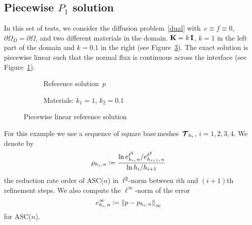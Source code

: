\subsection{Piecewise $P_1$ solution}

In this set of tests, we consider the diffusion problem~\eqref{dual} with~$c \equiv f \equiv 0$, $\partial\Omega_D = \partial\Omega$, and two different materials in the domain. $\boldsymbol{\mathbf{K}} = k\,\boldsymbol{\mathbf{I}}$, $k = 1$ in the left part of the domain and $k = 0.1$ in the right (see Figure~\ref{fig:pwlin:mat}). The exact solution is piecewise linear such that the normal flux is continuous across the interface (see Figure~\ref{fig:pwlin:p}).
	
\begin{figure}[h!]
	\centering
	\label{fig:pwlin}
	\begin{subfigure}{.44\linewidth}
		\centering
		\caption{Reference solution~$p$}
		\label{fig:pwlin:p}
	\end{subfigure}%
	\hfill
	\begin{subfigure}{.4\linewidth}
		\centering
		\caption{Materials: $k_1 = 1$, $k_2 = 0.1$}
		\label{fig:pwlin:mat}
	\end{subfigure}
	\caption{Piecewise linear reference solution}
\end{figure}

For this example we use a sequence of square base\,meshes~${\boldsymbol{\mathbf{\mathcal T}}}_{h_i}$, $i = 1, 2, 3, 4$. We denote by
\begin{equation*}
	\rho_{h_i,\,n} \coloneqq \frac{\ln e^{{\ell^2}}_{h_i,\,n} / e^{{\ell^2}}_{h_{i+1},\,n}}{\ln h_i / h_{i+1}}
\end{equation*}
the reduction rate order of ASC($n$) in~${\ell^2}$-norm between $i$th and $(i+1)$th refinement steps. We also compute the $\ell^{\infty}$-norm of the error
\begin{equation*}
	e^{\infty}_{h_i,\,n} \coloneqq \left\| p - p_{h_i,\,n} \right\|_\infty
\end{equation*}
for ASC($n$).
	
